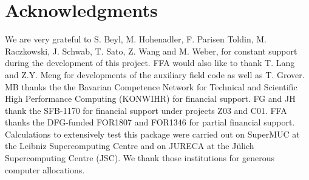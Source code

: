 \section*{Acknowledgments} 

We are very grateful to  S. Beyl, M. Hohenadler,  F. Parisen Toldin,  M. Raczkowski,  J. Schwab, T. Sato, Z. Wang and M. Weber,  for constant support during the development of this project.  FFA would also like to thank T. Lang   and Z.Y. Meng for  developments of the auxiliary field code as well as T. Grover. 
MB thanks the the Bavarian Competence Network for Technical and Scientific High Performance Computing (KONWIHR) for financial support. FG  and JH thank the SFB-1170 for  financial support under projects Z03 and C01.  FFA thanks the DFG-funded FOR1807 and FOR1346 for partial financial support.
Calculations  to extensively test this package were carried out on SuperMUC at the  Leibniz Supercomputing Centre and on  JURECA \cite{Jureca16} at the J\"ulich Supercomputing Centre (JSC). We thank those institutions for generous computer allocations.  
